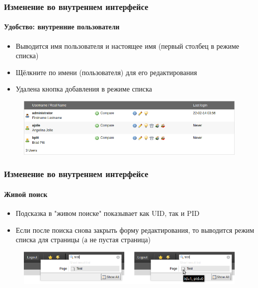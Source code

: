 
\begin{frame}[fragile]
	\frametitle{Изменение во внутреннем интерфейсе}
	\framesubtitle{Удобство: внутренние пользователи}

	\begin{itemize}
		\item Выводится имя пользователя и настоящее имя (первый столбец в режиме списка)
		\item Щёлкните по имени (пользователя) для его редактирования
		\item Удалена кнопка добавления в режиме списка

	\end{itemize}

	\begin{figure}
		\includegraphics[width=0.95\linewidth]{Images/BackendChanges/BackendUserList.png}
	\end{figure}

\end{frame}


\begin{frame}[fragile]
	\frametitle{Изменение во внутреннем интерфейсе}
	\framesubtitle{Живой поиск}

	\begin{itemize}
		\item Подсказка в "живом поиске" показывает как UID, так и PID
		\item Если после поиска снова закрыть форму редактирования, то выводится режим списка для страницы (а не пустая страница)
	\end{itemize}

	\begin{figure}
		\includegraphics[width=0.8\linewidth]{Images/BackendChanges/LiveSearchTooltip.png}
	\end{figure}

\end{frame}

